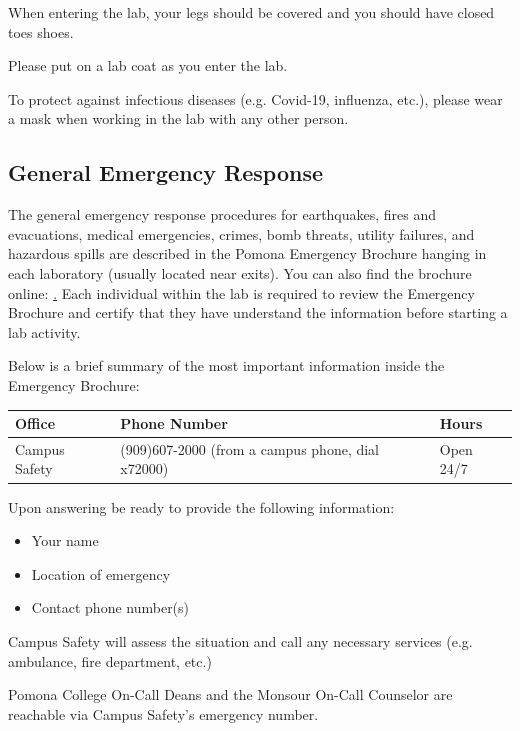 \documentclass[12pt]{../../cls/SOP4_alpha}\usepackage[]{graphicx}\usepackage[]{xcolor}
\begin{document}
\NP When entering the lab, your legs should be covered and you should have closed toes shoes. 

\NP Please put on a lab coat as you enter the lab. 

\NP To protect against infectious diseases (e.g. Covid-19, influenza, etc.), please wear a mask when working in the lab with any other person. 

\subsection*{General Emergency Response}

\NP The general emergency response procedures for earthquakes, fires and evacuations, medical emergencies, crimes, bomb threats, utility failures, and hazardous spills are described in the Pomona Emergency Brochure hanging in each laboratory (usually located near exits). You can also find the brochure online: \href{http://www.pomona.edu/sites/default/files/emergency-instructions.pdf}. Each individual within the lab is required to review the Emergency Brochure and certify that they have understand the information before starting a lab activity.

\NP Below is a brief summary of the most important information inside the Emergency Brochure: 

\begin{table}
\begin{tabular}{lll} \hline
Office            & Phone Number & Hours \\ \hline\hline
Campus Safety     & (909)607-2000 (from a campus phone, dial x72000) & Open 24/7 \\ \hline
\end{tabular}
\end{table}

\NP Upon answering be ready to provide the following information:

\begin{itemize}
  \item Your name
  \item Location of emergency
  \item Contact phone number(s)
\end{itemize}

\NP Campus Safety will assess the situation and call any necessary services (e.g. ambulance, fire department, etc.)

\NP Pomona College On-Call Deans and the Monsour On-Call Counselor are reachable via Campus Safety's emergency number. 
\end{document}
